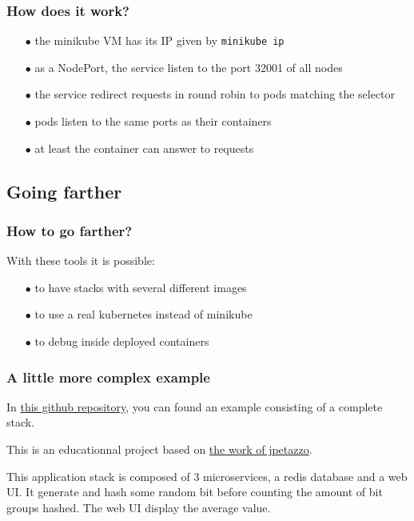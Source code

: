 	\begin{frame}[fragile]
		\frametitle{How does it work?}
		
		\begin{itemize}
			\item[$\bullet$] the minikube VM has its IP given by \verb!minikube ip!
			\item[$\bullet$] as a NodePort, the service listen to the port 32001 of all nodes
			\item[$\bullet$] the service redirect requests in round robin to pods matching the selector
			\item[$\bullet$] pods listen to the same ports as their containers
			\item[$\bullet$] at least the container can answer to requests
		\end{itemize}
	\end{frame}
	
\subsection{Going farther}
	\begin{frame}
		\frametitle{How to go farther?}
		
		With these tools it is possible:
		\begin{itemize}
			\item[$\bullet$] to have stacks with several different images
			\item[$\bullet$] to use a real kubernetes instead of minikube
			\item[$\bullet$] to debug inside deployed containers
		\end{itemize}
	\end{frame}
	
	\begin{frame}
		\frametitle{A little more complex example}
		
		In \href{https://github.com/Tinkou/kubercoins}{this github repository}, you can found an example consisting of a complete stack.
		
		\bigskip
		
		This is an educationnal project based on \href{https://github.com/jpetazzo/dockercoins}{the work of jpetazzo}.
		
		\medskip
		
		This application stack is composed of 3 microservices, a redis database and a web UI. It generate and hash some random bit before counting the amount of bit groups hashed. The web UI display the average value.
		
	\end{frame}
	
